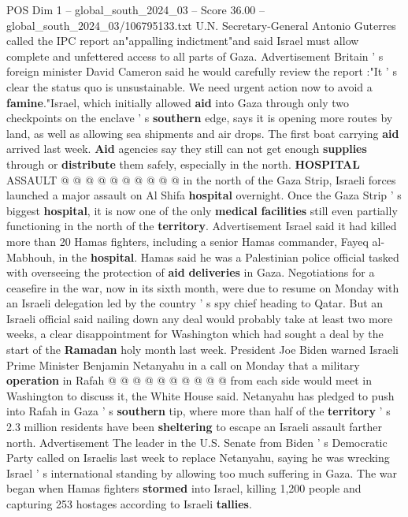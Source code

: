 \begin{textsample}{POS Dim 1 – global\_south\_2024\_03 – Score 36.00 – global\_south\_2024\_03/106795133.txt}
U.N.
Secretary-General Antonio Guterres called the IPC report an"appalling indictment"and said Israel must allow complete and unfettered access to all parts of Gaza.
Advertisement Britain ' s foreign minister David Cameron said he would carefully review the report :"It ' s clear the status quo is unsustainable.
We need urgent action now to avoid a \textbf{famine}."Israel, which initially allowed \textbf{aid} into Gaza through only two checkpoints on the enclave ' s \textbf{southern} edge, says it is opening more routes by land, as well as allowing sea shipments and air drops.
The first boat carrying \textbf{aid} arrived last week. \textbf{Aid} agencies say they still can not get enough \textbf{supplies} through or \textbf{distribute} them safely, especially in the north. \textbf{HOSPITAL} ASSAULT @ @ @ @ @ @ @ @ @ @ in the north of the Gaza Strip, Israeli forces launched a major assault on Al Shifa \textbf{hospital} overnight.
Once the Gaza Strip ' s biggest \textbf{hospital}, it is now one of the only \textbf{medical} \textbf{facilities} still even partially functioning in the north of the \textbf{territory}.
Advertisement Israel said it had killed more than 20 Hamas fighters, including a senior Hamas commander, Fayeq al-Mabhouh, in the \textbf{hospital}.
Hamas said he was a Palestinian police official tasked with overseeing the protection of \textbf{aid} \textbf{deliveries} in Gaza.
Negotiations for a ceasefire in the war, now in its sixth month, were due to resume on Monday with an Israeli delegation led by the country ' s spy chief heading to Qatar.
But an Israeli official said nailing down any deal would probably take at least two more weeks, a clear disappointment for Washington which had sought a deal by the start of the \textbf{Ramadan} holy month last week.
President Joe Biden warned Israeli Prime Minister Benjamin Netanyahu in a call on Monday that a military \textbf{operation} in Rafah @ @ @ @ @ @ @ @ @ @ from each side would meet in Washington to discuss it, the White House said.
Netanyahu has pledged to push into Rafah in Gaza ' s \textbf{southern} tip, where more than half of the \textbf{territory} ' s 2.3 million residents have been \textbf{sheltering} to escape an Israeli assault farther north.
Advertisement The leader in the U.S.
Senate from Biden ' s Democratic Party called on Israelis last week to replace Netanyahu, saying he was wrecking Israel ' s international standing by allowing too much suffering in Gaza.
The war began when Hamas fighters \textbf{stormed} into Israel, killing 1,200 people and capturing 253 hostages according to Israeli \textbf{tallies}.

\end{textsample}
